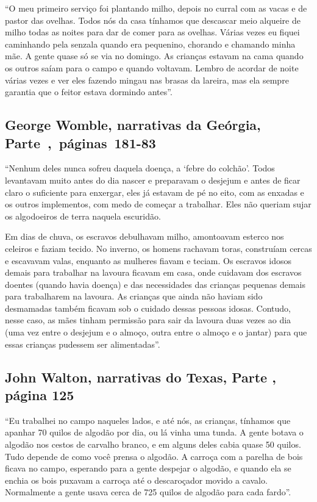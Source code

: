 ``O meu primeiro serviço foi plantando milho, depois no curral com as
vacas e de pastor das ovelhas. Todos nós da casa tínhamos que descascar
meio alqueire de milho todas as noites para dar de comer para as
ovelhas. Várias vezes eu fiquei caminhando pela senzala quando era
pequenino, chorando e chamando minha mãe. A gente quase só se via no
domingo. As crianças estavam na cama quando os outros saíam para o campo
e quando voltavam. Lembro de acordar de noite várias vezes e ver eles
fazendo mingau nas brasas da lareira, mas ela sempre garantia que o
feitor estava dormindo antes''.

\subsection{George Womble, narrativas da Geórgia, Parte~,~páginas~181-83}
\label{ref306}

``Nenhum deles nunca sofreu daquela doença, a `febre do colchão'. Todos
levantavam muito antes do dia nascer e preparavam o desjejum e antes de
ficar claro o suficiente para enxergar, eles já estavam de pé no eito,
com as enxadas e os outros implementos, com medo de começar a trabalhar.
Eles não queriam sujar os algodoeiros de terra naquela escuridão.

Em dias de chuva, os escravos debulhavam milho, amontoavam esterco nos
celeiros e faziam tecido. No inverno, os homens rachavam toras,
construíam cercas e escavavam valas, enquanto as mulheres fiavam e
teciam. Os escravos idosos demais para trabalhar na lavoura ficavam em
casa, onde cuidavam dos escravos doentes (quando havia doença) e das
necessidades das crianças pequenas demais para trabalharem na lavoura.
As crianças que ainda não haviam sido desmamadas também ficavam sob o
cuidado dessas pessoas idosas. Contudo, nesse caso, as mães tinham
permissão para sair da lavoura duas vezes ao dia (uma vez entre o
desjejum e o almoço, outra entre o almoço e o jantar) para que essas
crianças pudessem ser alimentadas''.

\subsection{John Walton, narrativas do Texas, Parte , página 125}
\label{ref273}

``Eu trabalhei no campo naqueles lados, e até nós, as crianças, tínhamos
que apanhar 70 quilos de algodão por dia, ou lá vinha uma tunda. A gente
botava o algodão nos cestos de carvalho branco, e em alguns deles cabia
quase 50 quilos. Tudo depende de como você prensa o algodão. A carroça
com a parelha de bois ficava no campo, esperando para a gente despejar o
algodão, e quando ela se enchia os bois puxavam a carroça até o
descaroçador movido a cavalo. Normalmente a gente usava cerca de 725
quilos de algodão para cada fardo''.

